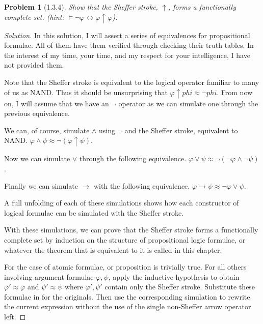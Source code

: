 \documentclass[letter]{article}
\newtheorem{problem}{Problem}
\theoremstyle{definition}
\newenvironment{solution}
{\begin{proof}[Solution]}
	{\end{proof}}
\renewcommand{\phi}{\varphi}
\begin{document}
\begin{problem}[1.3.4] Show that the Sheffer stroke, $\uparrow$, forms a functionally complete set. (hint: $\models \neg \phi \leftrightarrow \phi \uparrow \phi$).
\end{problem}
\begin{solution}
  In this solution, I will assert a series of equivalences for propositional formulae. All of them have them verified through checking their truth tables. In the interest of my time, your time, and my respect for your intelligence, I have not provided them.

  Note that the Sheffer stroke is equivalent to the logical operator familiar to many of us as NAND. Thus it should be unsurprising that $\phi \uparrow phi \approx \lnot phi$. From now on, I will assume that we have an $\lnot$ operator as we can simulate one through the previous equivalence.
  
  We can, of course, simulate $\land$ using $\lnot$ and the Sheffer stroke, equivalent to NAND. $\phi \land \psi \approx \lnot (\phi \uparrow \psi)$.

  Now we can simulate $\lor$ through the following equivalence. $\phi \lor \psi \approx \lnot (\lnot \phi \land \lnot \psi)$.

  Finally we can simulate $\to$ with the following equivalence. $\phi \to \psi \approx \lnot \phi \lor \psi$.

  A full unfolding of each of these simulations shows how each constructor of logical formulae can be simulated with the Sheffer stroke.

  With these simulations, we can prove that the Sheffer stroke forms a functionally complete set by induction on the structure of propositional logic formulae, or whatever the theorem that is equivalent to it is called in this chapter.

  For the case of atomic formulae, or proposition is trivially true. For all others involving argument formulae $\phi,\psi$, apply the inductive hypothesis to obtain $\phi'\approx \phi$ and $\psi' \approx \psi$ where $\phi',\psi'$ contain only the Sheffer stroke. Substitute these formulae in for the originals. Then use the corresponding simulation to rewrite the current expression without the use of the single non-Sheffer arrow operator left.
\end{solution}
\end{document}
